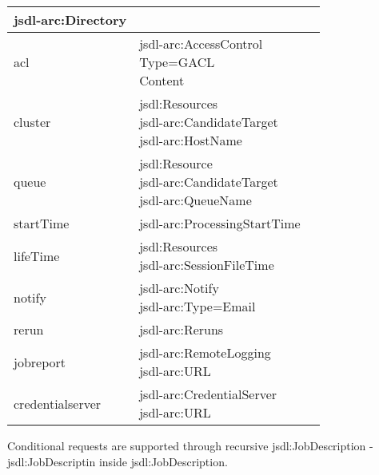 \begin{longtable}{|l|l|p{5cm}|}
{    \hspace*{0.5cm}jsdl-arc:Directory} & \\ \hline
acl &  \parbox[t]{5.5cm}{
    jsdl-arc:AccessControl \\
    \hspace*{0.5cm}Type=GACL \\
    \hspace*{0.5cm}Content} & \\ \hline
cluster &  \parbox[t]{5.5cm}{
    jsdl:Resources \\
    \hspace*{0.5cm}jsdl-arc:CandidateTarget \\
    \hspace*{1cm}jsdl-arc:HostName} & \\ \hline
queue &  \parbox[t]{5.5cm}{
    jsdl:Resource \\
    \hspace*{0.5cm}jsdl-arc:CandidateTarget \\
    \hspace*{1cm}jsdl-arc:QueueName} & \\ \hline
startTime & jsdl-arc:ProcessingStartTime & \\ \hline
lifeTime & \parbox[t]{5.5cm}{
    jsdl:Resources \\
    \hspace*{0.5cm}jsdl-arc:SessionFileTime} & \\ \hline
notify & \parbox[t]{5.5cm}{
    jsdl-arc:Notify \\
    \hspace*{0.5cm}jsdl-arc:Type=Email} & \\ \hline
rerun & jsdl-arc:Reruns & \\ \hline
jobreport & \parbox[t]{5.5cm}{
    jsdl-arc:RemoteLogging \\
    \hspace*{0.5cm}jsdl-arc:URL} & \\ \hline
credentialserver & \parbox[t]{5.5cm}{
    jsdl-arc:CredentialServer \\
    \hspace*{0.5cm}jsdl-arc:URL} & \\ \hline
\end{longtable}

Conditional requests are supported through recursive jsdl:JobDescription - 
jsdl:JobDescriptin inside jsdl:JobDescription.
